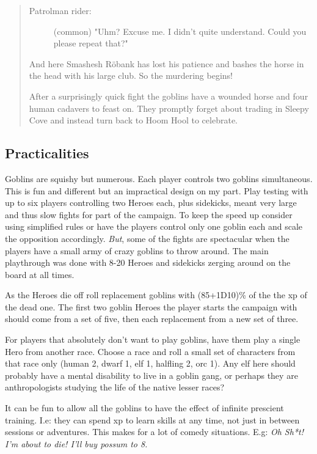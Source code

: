 \begin{quote}
\begin{small}
\begin{description}
\item[Patrolman rider:] \vvsmall (common) \small
"Uhm? Excuse me. I didn't quite understand. Could you please repeat that?"

\end{description}

And here Smashesh Röbank has lost his patience and bashes the horse in the head with his large club. So the murdering begins!

After a surprisingly quick fight the goblins have a wounded horse and four human cadavers to feast on. They promptly forget about trading in Sleepy Cove and instead turn back to Hoom Hool to celebrate.

\end{small}
\end{quote}


\subsection*{Practicalities}

Goblins are squishy but numerous. Each player controls two goblins simultaneous. This is fun and different but an impractical design on my part. Play testing with up to six players controlling two Heroes each, plus sidekicks, meant very large and thus slow fights for part of the campaign. To keep the speed up consider using simplified rules or have the players control only one goblin each and scale the opposition accordingly. \emph{But}, some of the fights are spectacular when the players have a small army of crazy goblins to throw around. The main playthrough was done with 8-20 Heroes and sidekicks zerging around on the board at all times.

As the Heroes die off roll replacement goblins with (85+1D10)\% of the the xp of the dead one. The first two goblin Heroes the player starts the campaign with should come from a set of five, then each replacement from a new set of three.

For players that absolutely don't want to play goblins, have them play a single Hero from another race. Choose a race and roll a small set of characters from that race only (human 2, dwarf 1, elf 1, halfling 2, orc 1). Any elf here should probably have a mental disability to live in a goblin gang, or perhaps they are anthropologists studying the life of the native lesser races?

It can be fun to allow all the goblins to have the effect of infinite prescient training. I.e: they can spend xp to learn skills at any time, not just in between sessions or adventures. This makes for a lot of comedy situations. E.g: \emph{Oh Sh*t! I'm about to die! I'll buy possum to 8.}


